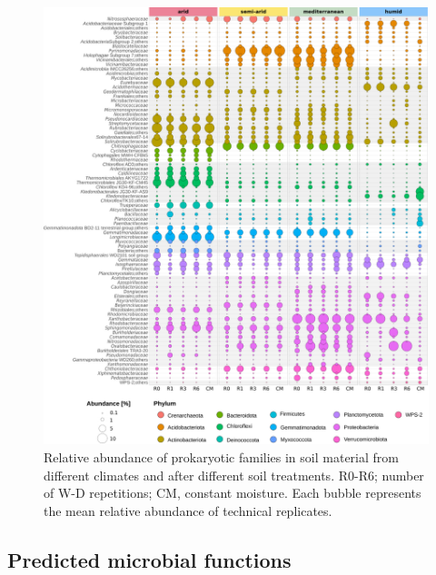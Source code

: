 \begin{figure}[H]
	\centering
	\includegraphics[width=1\textwidth]{img/M4-Figure_6.png}
	\caption[Relative abundance of prokaryotic families in soil material from different climates and after different soil treatments]{Relative abundance of prokaryotic families in soil material from different climates and after different soil treatments. R0-R6; number of W-D repetitions; CM, constant moisture. Each bubble represents the mean relative abundance of technical replicates.}
	\label{fig:M4-F6}
\end{figure}

\subsection{Predicted microbial functions}

